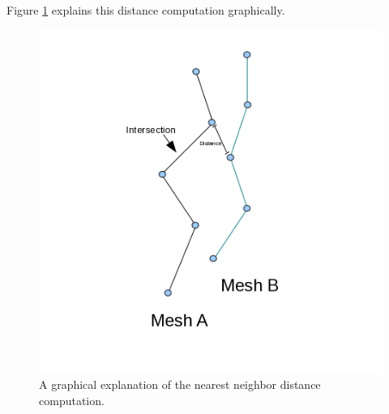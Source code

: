 \documentclass{ComputationalAlgorithmsArticle}
\begin{document}
Figure \ref{fig:NearestNeighbor} explains this distance computation graphically.

\begin{figure}[H]
  \centering
  \includegraphics[width=0.5\linewidth]{images/NearestNeighbor}
  \caption{A graphical explanation of the nearest neighbor distance computation.}
  \label{fig:NearestNeighbor}
\end{figure}
\end{document}
